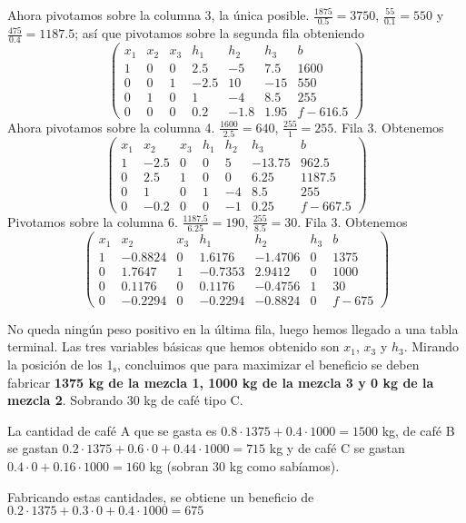 \documentclass[a4]{article}
\begin{document}
Ahora pivotamos sobre la columna 3, la única
posible. $\frac{1875}{0.5}=3750$, $\frac{55}{0.1}=550$ y
$\frac{475}{0.4}=1187.5$; así que pivotamos sobre la segunda fila
obteniendo
\[\begin{pmatrix}
    x_1 & x_2 & x_3 & h_1 & h_2 & h_3 & b \\
    1 & 0 & 0 &  2.5 &  -5  &  7.5  & 1600 \\
    0 & 0 & 1 & -2.5 &  10  &  -15  & 550 \\
    0 & 1 & 0 &   1  &  -4  &  8.5  & 255 \\
    0 & 0 & 0 &  0.2 & -1.8 &  1.95 & f-616.5
  \end{pmatrix}\] Ahora pivotamos sobre la columna
4. $\frac{1600}{2.5}=640$, $\frac{255}{1}=255$. Fila 3. Obtenemos
\[\begin{pmatrix}
    x_1 & x_2 & x_3 & h_1 & h_2 & h_3 & b \\
    1 & -2.5 & 0 & 0 &  5 & -13.75 & 962.5 \\
    0 &  2.5 & 1 & 0 &  0 &  6.25  & 1187.5 \\
    0 &   1  & 0 & 1 & -4 &  8.5   & 255 \\
    0 & -0.2 & 0 & 0 & -1 &  0.25  & f-667.5
  \end{pmatrix}\] Pivotamos sobre la columna
6. $\frac{1187.5}{6.25}=190$, $\frac{255}{8.5}=30$. Fila 3. Obtenemos
\[\begin{pmatrix}
    x_1 & x_2 & x_3 & h_1 & h_2 & h_3 & b \\
    1 & -0.8824 & 0 &  1.6176 & -1.4706 & 0 & 1375 \\
    0 &  1.7647 & 1 & -0.7353 &  2.9412 & 0 & 1000 \\
    0 &  0.1176 & 0 &  0.1176 & -0.4756 & 1 & 30 \\
    0 & -0.2294 & 0 & -0.2294 & -0.8824 & 0 & f-675
  \end{pmatrix}\]

No queda ningún peso positivo en la última fila, luego hemos llegado a
una tabla terminal. Las tres variables básicas que hemos obtenido son
$x_1$, $x_3$ y $h_3$. Mirando la posición de los 1$_\text{s}$,
concluimos que para maximizar el beneficio se deben fabricar
\textbf{1375 kg de la mezcla 1, 1000 kg de la mezcla 3 y 0 kg de la
  mezcla 2}. Sobrando 30 kg de café tipo C.

La cantidad de café A que se gasta es
$0.8\cdot 1375+0.4\cdot 1000=1500$ kg, de café B se gastan
$0.2\cdot 1375+0.6\cdot 0+0.44\cdot 1000=715$ kg y de café C se gastan
$0.4\cdot 0+0.16\cdot 1000=160$ kg (sobran 30 kg como sabíamos).

Fabricando estas cantidades, se obtiene un beneficio de
$0.2\cdot 1375+0.3\cdot 0+0.4\cdot 1000=675$ \EUR
\end{document}
